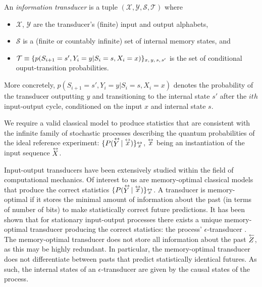 \begin{definition}
An \emph{information transducer} is a tuple $(\mathcal{X},\mathcal{Y},\mathcal{S},\mathcal{T})$ where
\begin{itemize}
    \item $\mathcal{X}$, $\mathcal{Y}$ are the transducer's (finite) input and output alphabets,
    \item $\mathcal{S}$ is a (finite or countably infinite) set of internal memory states, and
    \item $\mathcal{T}\equiv\{p(S_{i+1}=s', Y_i=y\vert S_i = s, X_i=x)\}_{x,\thinspace y,\thinspace s,\thinspace s'}$ is the set of conditional ouput-transition probabilities.
\end{itemize}
More concretely, $p(S_{i+1}=s', Y_i=y\vert S_i = s, X_i=x)$ denotes the probability of the transducer outputting $y$ and transitioning to the internal state $s'$ after the $ith$ input-output cycle, conditioned on the input $x$ and internal state $s$.
\end{definition}

We require a valid classical model to produce statistics that are consistent with the infinite family of stochastic processes describing the quantum probabilities of the ideal reference experiment: $\{P(\oset{\leftrightarrow}{Y}|\oset{\leftrightarrow}{x})\}_{\oset{\leftrightarrow}{x}}$\thinspace, $\oset{\leftrightarrow}{x}$ being an instantiation of the input sequence $\oset{\leftrightarrow}{X}$.

Input-output transducers have been extensively studied within the field of computational mechanics. Of interest to us are memory-optimal classical models that produce the correct statistics $\{P(\oset{\leftrightarrow}{Y}|\oset{\leftrightarrow}{x})\}_{\oset{\leftrightarrow}{x}}$\thinspace. A transducer is memory-optimal if it stores the minimal amount of information about the past (in terms of number of bits) to make statistically correct future predictions. It has been shown that for stationary input-output processes there exists a unique memory-optimal transducer producing the correct statistics: the process' $\epsilon$-transducer \cite{Barnett2015}. The memory-optimal transducer does not store all information about the past $\oset{\leftarrow}{Z}$, as this may be highly redundant. In particular, the memory-optimal transducer does not differentiate between pasts that predict statistically identical futures. As such, the internal states of an $\epsilon$-transducer are given by the causal states of the process. 

